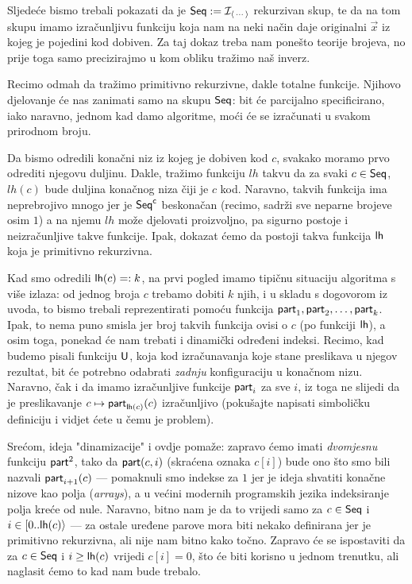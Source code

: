 Sljedeće bismo trebali pokazati da je $\mathsf{Seq}:=\mathcal I_{\langle\,\cdots\rangle}$ rekurzivan skup, te da na tom skupu imamo izračunljivu funkciju koja nam na neki način daje originalni $\vec x$ iz kojeg je pojedini kod dobiven. Za taj dokaz treba nam ponešto teorije brojeva, no prije toga samo precizirajmo u kom obliku tražimo naš inverz.

Recimo odmah da tražimo primitivno rekurzivne, dakle totalne funkcije. Njihovo djelovanje će nas zanimati samo na skupu $\mathsf{Seq}$: bit će parcijalno specificirano, iako naravno, jednom kad damo algoritme, moći će se izračunati u svakom prirodnom broju.

Da bismo odredili konačni niz iz kojeg je dobiven kod $c$, svakako moramo prvo odrediti njegovu duljinu. Dakle, tražimo funkciju $lh$ takvu da za svaki $c\in\mathsf{Seq}$, $lh(c)$ bude duljina konačnog niza čiji je $c$ kod. Naravno, takvih funkcija ima neprebrojivo mnogo jer je $\mathsf{Seq}\sp{\textup{\textsf c}}$ beskonačan (recimo, sadrži sve neparne brojeve osim $1$) a na njemu $lh$ može djelovati proizvoljno, pa sigurno postoje i neizračunljive takve funkcije. Ipak, dokazat ćemo da postoji takva funkcija $\mathsf{lh}$ koja je primitivno rekurzivna.

Kad smo odredili $\mathsf{lh}(c)=:k$, na prvi pogled imamo tipičnu situaciju algoritma s više izlaza: od jednog broja $c$ trebamo dobiti $k$ njih, i u skladu s dogovorom iz uvoda, to bismo trebali reprezentirati pomoću funkcija $\mathsf{part}_1,\mathsf{part}_2,\dotsc,\mathsf{part}_k$. Ipak, to nema puno smisla jer broj takvih funkcija ovisi o $c$ (po funkciji $\mathsf{lh}$), a osim toga, ponekad će nam trebati i dinamički određeni indeksi. Recimo, kad budemo pisali funkciju $\mathsf U$, koja kod izračunavanja koje stane preslikava u njegov rezultat, bit će potrebno odabrati \emph{zadnju} konfiguraciju u konačnom nizu. Naravno, čak i da imamo izračunljive funkcije $\mathsf{part}_i$ za sve $i$, iz toga ne slijedi da je preslikavanje $c\mapsto\mathsf{part}_{\mathsf{lh}(c)}(c)$ izračunljivo (pokušajte napisati simboličku definiciju i vidjet ćete u čemu je problem).

Srećom, ideja "dinamizacije" i ovdje pomaže: zapravo ćemo imati \emph{dvomjesnu} funkciju $\mathsf{part}^2$, tako da $\mathsf{part}(c,i)$ (skraćena oznaka $c[i]$) bude ono što smo bili nazvali $\mathsf{part}_{i+1}(c)$ --- pomaknuli smo indekse za $1$ jer je ideja shvatiti konačne nizove kao polja (\emph{arrays}), a u većini modernih programskih jezika indeksiranje polja kreće od nule. Naravno, bitno nam je da to vrijedi samo za $c\in\mathsf{Seq}$ i $i\in[0..\mathsf{lh}(c)\rangle$ --- za ostale uređene parove mora biti nekako definirana jer je primitivno rekurzivna, ali nije nam bitno kako točno. Zapravo će se ispostaviti da za $c\in\mathsf{Seq}$ i $i\ge\mathsf{lh}(c)$ vrijedi $c[i]=0$, što će biti korisno u jednom trenutku, ali naglasit ćemo to kad nam bude trebalo.


